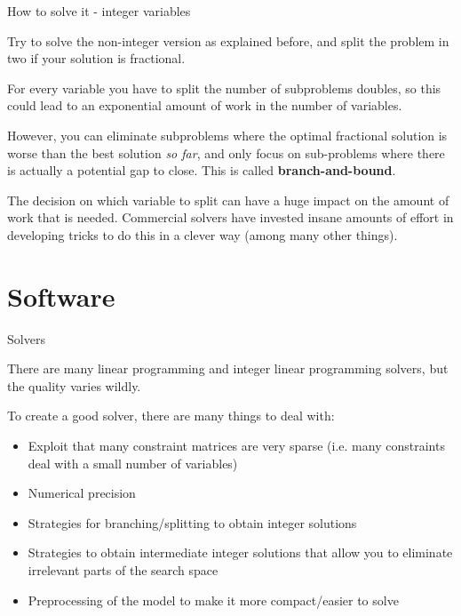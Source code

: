 \documentclass[10pt]{beamer}
\begin{document}
\begin{frame}[fragile]{How to solve it - integer variables}

Try to solve the non-integer version as explained before, and split the problem in two if your solution is fractional.

For every variable you have to split the number of subproblems doubles, so this could lead to an exponential amount of work in the number of variables.

However, you can eliminate subproblems where the optimal fractional solution is worse than the best solution \emph{so far}, and only focus on sub-problems
where there is actually a potential gap to close. This is called \textbf{branch-and-bound}.

The decision on which variable to split can have a huge impact on the amount of work that is needed. Commercial solvers have invested insane amounts of effort in
developing tricks to do this in a clever way (among many other things).

\end{frame}

\section{Software}

\begin{frame}[fragile]{Solvers}

There are many linear programming and integer linear programming solvers,
but the quality varies wildly.

To create a good solver, there are many things to deal with:

\begin{itemize}
	\item Exploit that many constraint matrices are very sparse (i.e. many constraints deal with a small number of variables)
	\item Numerical precision
	\item Strategies for branching/splitting to obtain integer solutions
	\item Strategies to obtain intermediate integer solutions that allow you to eliminate irrelevant parts of the search space
	\item Preprocessing of the model to make it more compact/easier to solve
\end{itemize}

\end{frame}
\end{document}

